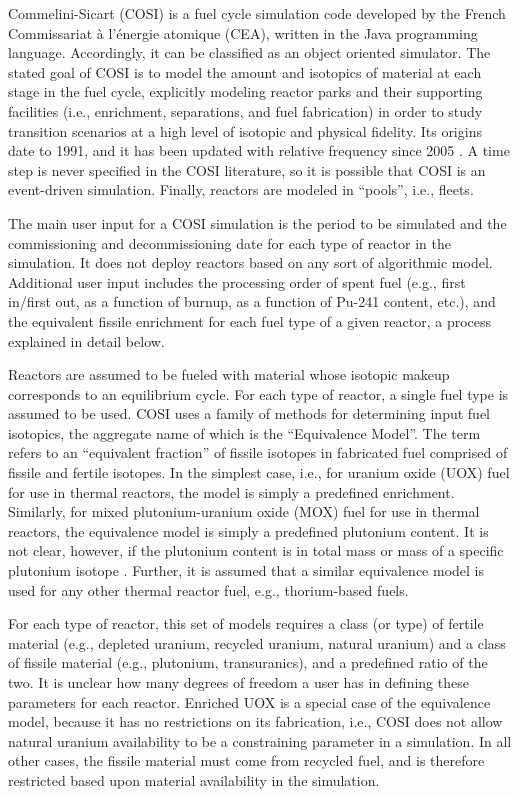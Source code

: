 Commelini-Sicart (COSI) is a fuel cycle simulation code developed by the French
Commissariat \`{a} l'\'{e}nergie atomique (CEA), written in the Java programming
language. Accordingly, it can be classified as an object oriented simulator. The
stated goal of COSI is to model the amount and isotopics of material at each
stage in the fuel cycle, explicitly modeling reactor parks and their supporting
facilities (i.e., enrichment, separations, and fuel fabrication) in order to
study transition scenarios at a high level of isotopic and physical
fidelity. Its origins date to 1991, and it has been updated with relative
frequency since 2005 \cite{boucher_cosi_2005,boucher_cosi:_2006,meyer_new_2009,
coquelet-pascal_validation_2011}. A time step is never specified in the COSI
literature, so it is possible that COSI is an event-driven simulation. Finally,
reactors are modeled in ``pools'', i.e., fleets.

The main user input for a COSI simulation is the period to be simulated and the
commissioning and decommissioning date for each type of reactor in the
simulation. It does not deploy reactors based on any sort of algorithmic
model. Additional user input includes the processing order of spent fuel
(e.g., first in/first out, as a function of burnup, as a function of Pu-241
content, etc.), and the equivalent fissile enrichment for each fuel type of a
given reactor, a process explained in detail below.

Reactors are assumed to be fueled with material whose isotopic makeup
corresponds to an equilibrium cycle. For each type of reactor, a single fuel
type is assumed to be used. COSI uses a family of methods for determining input
fuel isotopics, the aggregate name of which is the ``Equivalence Model''. The
term refers to an ``equivalent fraction'' of fissile isotopes in fabricated fuel
comprised of fissile and fertile isotopes. In the simplest case, i.e., for
uranium oxide (UOX) fuel for use in thermal reactors, the model is simply a
predefined enrichment.  Similarly, for mixed plutonium-uranium oxide (MOX) fuel
for use in thermal reactors, the equivalence model is simply a predefined
plutonium content. It is not clear, however, if the plutonium content is in
total mass or mass of a specific plutonium isotope \cite{meyer_new_2009,
coquelet-pascal_validation_2011}. Further, it is assumed that a similar
equivalence model is used for any other thermal reactor fuel, e.g.,
thorium-based fuels.

For each type of reactor, this set of models requires a class (or type) of
fertile material (e.g., depleted uranium, recycled uranium, natural uranium) and
a class of fissile material (e.g., plutonium, transuranics), and a predefined
ratio of the two. It is unclear how many degrees of freedom a user has in
defining these parameters for each reactor. Enriched UOX is a special case of
the equivalence model, because it has no restrictions on its fabrication, i.e.,
COSI does not allow natural uranium availability to be a constraining parameter
in a simulation. In all other cases, the fissile material must come from
recycled fuel, and is therefore restricted based upon material availability in
the simulation.

